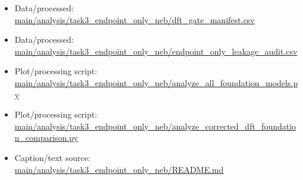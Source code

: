 \begin{itemize}[leftmargin=1.4em,noitemsep]
\item Data/processed: \begingroup\scriptsize\url{main/analysis/task3_endpoint_only_neb/dft_gate_manifest.csv}\endgroup
\item Data/processed: \begingroup\scriptsize\url{main/analysis/task3_endpoint_only_neb/endpoint_only_leakage_audit.csv}\endgroup
\item Plot/processing script: \begingroup\scriptsize\url{main/analysis/task3_endpoint_only_neb/analyze_all_foundation_models.py}\endgroup
\item Plot/processing script: \begingroup\scriptsize\url{main/analysis/task3_endpoint_only_neb/analyze_corrected_dft_foundation_comparison.py}\endgroup
\item Caption/text source: \begingroup\scriptsize\url{main/analysis/task3_endpoint_only_neb/README.md}\endgroup
\end{itemize}
